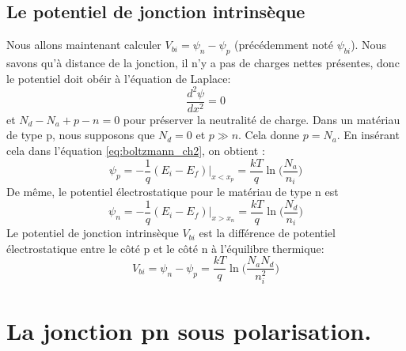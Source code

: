 \subsection{Le potentiel de jonction intrinsèque}
Nous allons maintenant calculer $V_{bi} = \psi_n - \psi_p$ (précédemment noté $\psi_{bi}$). Nous savons qu'à distance de la jonction, il n'y a pas de charges nettes présentes, donc le potentiel doit obéir à l'équation de Laplace:
$$
\frac{d^2 \psi}{dx^2} = 0
$$
et $N_d - N_a + p - n = 0$ pour préserver la neutralité de charge. Dans un matériau de type p, nous supposons que $N_d = 0$ et $p \gg n$. Cela donne $p = N_a$. En insérant cela dans l'équation \ref{eq:boltzmann_ch2}, on obtient :
$$
\psi_p = -\frac{1}{q} (E_i - E_f) |_{x < x_p} = \frac{kT}{q} \ln\Big(\frac{N_a}{n_i}\Big)
$$
De même, le potentiel électrostatique pour le matériau de type n est
$$
\psi_n = -\frac{1}{q} (E_i - E_f) |_{x > x_n} = \frac{kT}{q} \ln\Big(\frac{N_d}{n_i}\Big)
$$
Le potentiel de jonction intrinsèque $V_{bi}$ est la différence de potentiel électrostatique entre le côté p et le côté n à l'équilibre thermique:
\begin{equation}
    V_{bi} = \psi_n - \psi_p = \frac{kT}{q} \ln\Big(\frac{N_a N_d}{n_i^2}\Big)
    \label{eq:vbi}
\end{equation}

\section{La jonction pn sous polarisation.}


